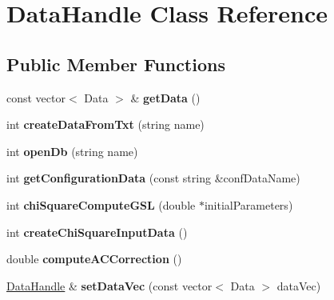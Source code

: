 \hypertarget{classDataHandle}{\section{Data\+Handle Class Reference}
\label{classDataHandle}
}
\subsection*{Public Member Functions}
\begin{DoxyCompactItemize}
\item 
\hypertarget{classDataHandle_a0c73485b27cb84a81e8ce8687cadb0be}{const vector$<$ Data $>$ \& {\bfseries get\+Data} ()}\label{classDataHandle_a0c73485b27cb84a81e8ce8687cadb0be}

\item 
\hypertarget{classDataHandle_a9daeca703197d8d7f9bb71bd096a2d66}{int {\bfseries create\+Data\+From\+Txt} (string name)}\label{classDataHandle_a9daeca703197d8d7f9bb71bd096a2d66}

\item 
\hypertarget{classDataHandle_ac8656eccbd5bc3b9819e272e1ff85e70}{int {\bfseries open\+Db} (string name)}\label{classDataHandle_ac8656eccbd5bc3b9819e272e1ff85e70}

\item 
\hypertarget{classDataHandle_a6fa18d21b416a4a878734fdf80a51161}{int {\bfseries get\+Configuration\+Data} (const string \&conf\+Data\+Name)}\label{classDataHandle_a6fa18d21b416a4a878734fdf80a51161}

\item 
\hypertarget{classDataHandle_ab6355e1e77c6f124e602c36388238a69}{int {\bfseries chi\+Square\+Compute\+G\+S\+L} (double $\ast$initial\+Parameters)}\label{classDataHandle_ab6355e1e77c6f124e602c36388238a69}

\item 
\hypertarget{classDataHandle_a9b4e75dae66933abb398b618f2f7dc19}{int {\bfseries create\+Chi\+Square\+Input\+Data} ()}\label{classDataHandle_a9b4e75dae66933abb398b618f2f7dc19}

\item 
\hypertarget{classDataHandle_a4ebb85e195a8964b361f64e68b85a73f}{double {\bfseries compute\+A\+C\+Correction} ()}\label{classDataHandle_a4ebb85e195a8964b361f64e68b85a73f}

\item 
\hypertarget{classDataHandle_ac60d11a794805bc2f598a8aa337e1c51}{\hyperlink{classDataHandle}{Data\+Handle} \& {\bfseries set\+Data\+Vec} (const vector$<$ Data $>$ data\+Vec)}\label{classDataHandle_ac60d11a794805bc2f598a8aa337e1c51}


\end{DoxyCompactItemize}
